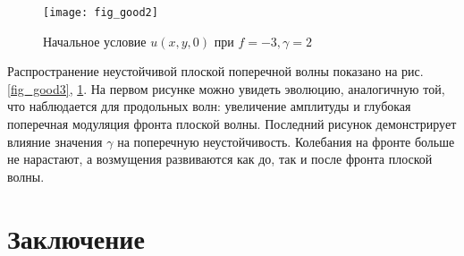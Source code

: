 \begin{figure}
	\centering
	\texttt{[image: fig\_good2]}
	\caption{Начальное условие $u(x,y,0)$ при $f = -3, \gamma = 2$} \label{fig_good2}
\end{figure}

Распространение неустойчивой плоской поперечной волны показано на рис. ~ \ref {fig_good3}, \ref{fig_good2}. На первом рисунке можно увидеть эволюцию, аналогичную той, что наблюдается для продольных волн: увеличение амплитуды и глубокая поперечная модуляция фронта плоской волны. Последний рисунок демонстрирует влияние значения $ \gamma $ на поперечную неустойчивость. Колебания на фронте больше не нарастают, а возмущения развиваются как до, так и после фронта плоской волны.


\section{Заключение}



